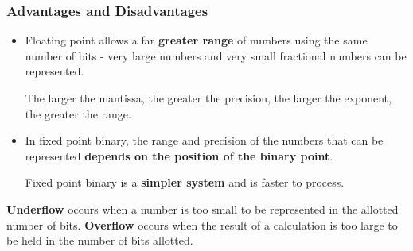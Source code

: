 \subsubsection*{Advantages and Disadvantages}
\begin{itemize}
    \item Floating point allows a far \textbf{greater range} of numbers using the same number of bits - very large numbers and very small fractional numbers can be represented.

        The larger the mantissa, the greater the precision, the larger the exponent, the greater the range.
    \item In fixed point binary, the range and precision of the numbers that can be represented \textbf{depends on the position of the binary point}.

        Fixed point binary is a \textbf{simpler system} and is faster to process.
\end{itemize}

\textbf{Underflow} occurs when a number is too small to be represented in the allotted number of bits. \textbf{Overflow} occurs when the result of a calculation is too large to be held in the number of bits allotted.

